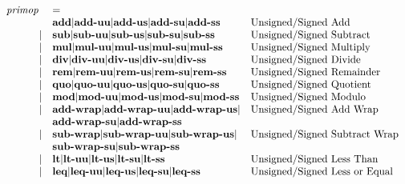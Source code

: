 \documentclass[12pt]{article}
\begin{document}
\[
\begin{array}{rll}
\text{\em primop\ }     &= \\
                &\text{\bf add}         \vert \text{\bf add-uu}      \vert \text{\bf add-us}      \vert \text{\bf add-su}   \vert \text{\bf add-ss}     &\text{Unsigned/Signed Add}\\
\vert           &\text{\bf sub}         \vert \text{\bf sub-uu}      \vert \text{\bf sub-us}      \vert \text{\bf sub-su}   \vert \text{\bf sub-ss}     &\text{Unsigned/Signed Subtract}\\
\vert           &\text{\bf mul}         \vert \text{\bf mul-uu}      \vert \text{\bf mul-us}      \vert \text{\bf mul-su}   \vert \text{\bf mul-ss}     &\text{Unsigned/Signed Multiply}\\
\vert           &\text{\bf div}         \vert \text{\bf div-uu}      \vert \text{\bf div-us}      \vert \text{\bf div-su}   \vert \text{\bf div-ss}     &\text{Unsigned/Signed Divide}\\
\vert           &\text{\bf rem}         \vert \text{\bf rem-uu}      \vert \text{\bf rem-us}      \vert \text{\bf rem-su}   \vert \text{\bf rem-ss}     &\text{Unsigned/Signed Remainder}\\
\vert           &\text{\bf quo}         \vert \text{\bf quo-uu}      \vert \text{\bf quo-us}      \vert \text{\bf quo-su}   \vert \text{\bf quo-ss}     &\text{Unsigned/Signed Quotient}\\
\vert           &\text{\bf mod}         \vert \text{\bf mod-uu}      \vert \text{\bf mod-us}      \vert \text{\bf mod-su}   \vert \text{\bf mod-ss}     &\text{Unsigned/Signed Modulo}\\
\vert           &\text{\bf add-wrap}    \vert \text{\bf add-wrap-uu} \vert \text{\bf add-wrap-us} \vert                                       &\text{Unsigned/Signed Add Wrap}\\
                &\text{\bf add-wrap-su} \vert \text{\bf add-wrap-ss}                                                                     &\\ 
\vert           &\text{\bf sub-wrap}    \vert \text{\bf sub-wrap-uu} \vert \text{\bf sub-wrap-us} \vert                                       &\text{Unsigned/Signed Subtract Wrap}\\
                &\text{\bf sub-wrap-su} \vert \text{\bf sub-wrap-ss}                                                                     &\\
\vert           &\text{\bf lt}          \vert \text{\bf lt-uu}       \vert \text{\bf lt-us}       \vert \text{\bf lt-su}    \vert \text{\bf lt-ss}      &\text{Unsigned/Signed Less Than}\\
\vert           &\text{\bf leq}         \vert \text{\bf leq-uu}      \vert \text{\bf leq-us}      \vert \text{\bf leq-su}   \vert \text{\bf leq-ss}     &\text{Unsigned/Signed Less or Equal}\\

\end{array}\]
\end{document}
